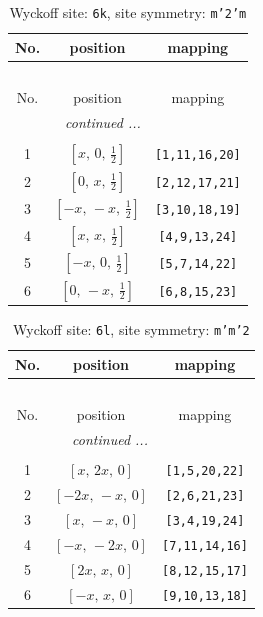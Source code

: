 \documentclass[fleqn,8pt]{jsarticle}
\begin{document}
\renewcommand{\arraystretch}{1.2}
\begin{longtable}{ccc}
\caption{Wyckoff site: {\tt 6k}, site symmetry: {\tt m'2'm}}
 \\
 \hline \hline
No. & position & mapping \\ \hline \endfirsthead

\multicolumn{2}{l}{\tablename\ \thetable{}} \\
 \hline \hline
No. & position & mapping \\ \hline \endhead

 \hline \hline
\multicolumn{2}{r}{\footnotesize\it continued ...} \\ \endfoot

 \hline \hline
\multicolumn{2}{r}{} \\ \endlastfoot

1 & $\left[ x,\, 0,\, \frac{1}{2} \right]$ & {\tt [1,11,16,20]} \\ \hline
2 & $\left[ 0,\, x,\, \frac{1}{2} \right]$ & {\tt [2,12,17,21]} \\ \hline
3 & $\left[ - x,\, - x,\, \frac{1}{2} \right]$ & {\tt [3,10,18,19]} \\ \hline
4 & $\left[ x,\, x,\, \frac{1}{2} \right]$ & {\tt [4,9,13,24]} \\ \hline
5 & $\left[ - x,\, 0,\, \frac{1}{2} \right]$ & {\tt [5,7,14,22]} \\ \hline
6 & $\left[ 0,\, - x,\, \frac{1}{2} \right]$ & {\tt [6,8,15,23]} \\
\end{longtable}
\renewcommand{\arraystretch}{1.2}
\begin{longtable}{ccc}
\caption{Wyckoff site: {\tt 6l}, site symmetry: {\tt m'm'2}}
 \\
 \hline \hline
No. & position & mapping \\ \hline \endfirsthead

\multicolumn{2}{l}{\tablename\ \thetable{}} \\
 \hline \hline
No. & position & mapping \\ \hline \endhead

 \hline \hline
\multicolumn{2}{r}{\footnotesize\it continued ...} \\ \endfoot

 \hline \hline
\multicolumn{2}{r}{} \\ \endlastfoot

1 & $\left[ x,\, 2 x,\, 0 \right]$ & {\tt [1,5,20,22]} \\ \hline
2 & $\left[ - 2 x,\, - x,\, 0 \right]$ & {\tt [2,6,21,23]} \\ \hline
3 & $\left[ x,\, - x,\, 0 \right]$ & {\tt [3,4,19,24]} \\ \hline
4 & $\left[ - x,\, - 2 x,\, 0 \right]$ & {\tt [7,11,14,16]} \\ \hline
5 & $\left[ 2 x,\, x,\, 0 \right]$ & {\tt [8,12,15,17]} \\ \hline
6 & $\left[ - x,\, x,\, 0 \right]$ & {\tt [9,10,13,18]} \\
\end{longtable}
\end{document}
